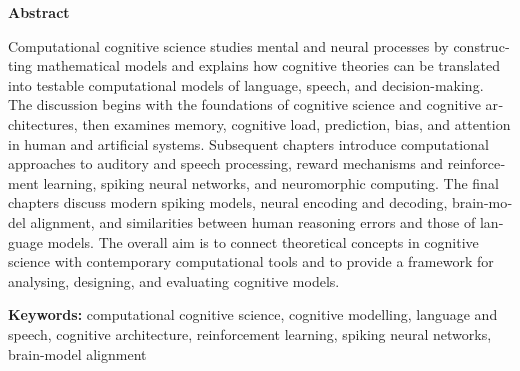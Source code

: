 \documentclass[12pt,a4paper]{book}
\begin{document}
\begingroup
\thispagestyle{empty}
\begin{latin}
{\LARGE\bfseries Abstract\par}
\vspace{1.5em}
Computational cognitive science studies mental and neural processes by constructing mathematical models and explains how cognitive theories can be translated into testable computational models of language, speech, and decision-making. The discussion begins with the foundations of cognitive science and cognitive architectures, then examines memory, cognitive load, prediction, bias, and attention in human and artificial systems. Subsequent chapters introduce computational approaches to auditory and speech processing, reward mechanisms and reinforcement learning, spiking neural networks, and neuromorphic computing. The final chapters discuss modern spiking models, neural encoding and decoding, brain-model alignment, and similarities between human reasoning errors and those of language models. The overall aim is to connect theoretical concepts in cognitive science with contemporary computational tools and to provide a framework for analysing, designing, and evaluating cognitive models.

\vfill
\textbf{Keywords:} computational cognitive science, cognitive modelling, language and speech, cognitive architecture, reinforcement learning, spiking neural networks, brain-model alignment
\end{latin}
\clearpage
\endgroup

\tableofcontents

\mainmatter









\end{document}
